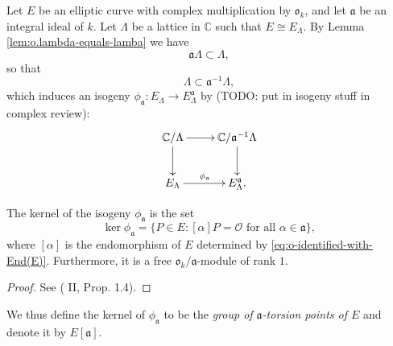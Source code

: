 Let $E$ be an elliptic curve with complex multiplication by $\mathfrak{o}_{k}$, and
let $\mathfrak{a}$ be an integral ideal of $k$.  Let $\Lambda$ be a lattice in
$\mathbb{C}$ such that $E \cong E_{\Lambda}$.  By Lemma
\ref{lem:o.lambda-equals-lamba} we have
\begin{equation*}
  \mathfrak{a}\Lambda \subset \Lambda,
\end{equation*}
so that
\begin{equation*}
  \Lambda \subset \mathfrak{a}^{-1}\Lambda,
\end{equation*}
which induces an isogeny $\phi_{\mathfrak{a}} : E_{\Lambda} \rightarrow
E_{\Lambda}^{\mathfrak{a}}$ by (TODO: put in isogeny stuff in complex review):
\begin{equation*}
  \xymatrix{
    \mathbb{C} / \Lambda \ar[d] \ar[r] & \mathbb{C} / \mathfrak{a}^{-1}\Lambda \ar[d] \\
    E_{\Lambda} \ar[r]^{\phi_{\mathfrak{a}}} & E_{\Lambda}^{\mathfrak{a}}.
  }
\end{equation*}
\begin{prop}
  \label{prop:a-torsion-is-kernel}
  The kernel of the isogeny $\phi_{\mathfrak{a}}$ is the set
  \begin{equation*}
    \ker{\phi_{\mathfrak{a}}} = \{ P \in E : [\alpha]P = \mathcal{O} \text{ for all } \alpha
    \in \mathfrak{a} \},
  \end{equation*}
  where $[\alpha]$ is the endomorphism of $E$ determined by
  \eqref{eq:o-identified-with-End(E)}.  Furthermore, it is a free $\mathfrak{o}_{k} /
  \mathfrak{a}$-module of rank $1$.
\end{prop}
\begin{proof}
  See (\cite{silverman94} II, Prop. 1.4).
\end{proof}

We thus define the kernel of $\phi_{\mathfrak{a}}$ to be the \emph{group of
  $\mathfrak{a}$-torsion points of $E$} and denote it by $E[\mathfrak{a}]$.

